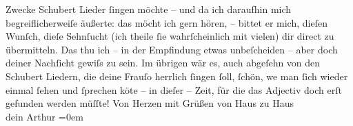 \begin{ledgroupsized}[t]{13cm}
{                  Zwecke}{}\label{K_L02203-2h}{ }Schubert Lieder ſingen möchte – und da ich
               daraufhin mich begreiflicherweiſe äußerte: das möcht ich gern hören, – bittet er
               mich,  dieſen Wunſch, dieſe Sehnſucht {\pb}(ich theile ſie
               wahrſcheinlich mit vielen) dir direct zu übermitteln. Das thu ich – in der Empfindung
               etwas unbeſcheiden – aber doch deiner Nachſicht gewiſs zu sein. Im übrigen wär es,
               auch abgeſehn von den Schubert Liedern, die
               deine Frauſo herrlich ſingen ſoll, ſchön, we{\geminationn} man ſich wieder einmal ſehen und ſprechen kö{\geminationn}te – in dieſer – Zeit, für die das Adjectiv doch erſt
               gefunden werden müſſte!\pend
           \pstart
           Von Herzen mit Grüßen von Haus zu Haus{\\[\baselineskip]}dein \spacefill\mbox{Arthur}\pend
           \leftskip=0em{}
         
         \endnumbering{}\end{ledgroupsized}  \newcommand{\dateiname}{L02203}\newcommand{\titel}{Arthur Schnitzler an Hermann Bahr, 9. 2. 1915}\newcommand{\editorInnen}{ Kurt Ifkovits,  Martin Anton Müller}
      